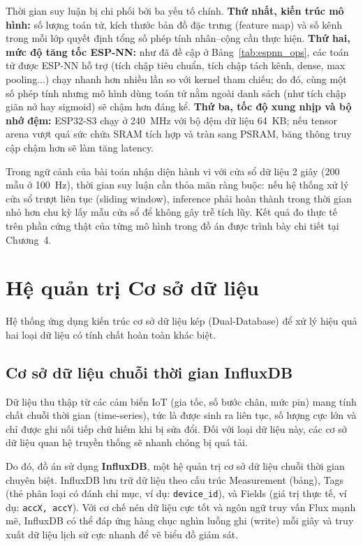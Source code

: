 \documentclass[../DoAn.tex]{subfiles}
\begin{document}
Thời gian suy luận bị chi phối bởi ba yếu tố chính. \textbf{Thứ nhất, kiến trúc mô hình:} số lượng toán tử, kích thước bản đồ đặc trưng (feature map) và số kênh trong mỗi lớp quyết định tổng số phép tính nhân--cộng cần thực hiện. \textbf{Thứ hai, mức độ tăng tốc ESP-NN:} như đã đề cập ở Bảng~\ref{tab:espnn_ops}, các toán tử được ESP-NN hỗ trợ (tích chập tiêu chuẩn, tích chập tách kênh, dense, max pooling...) chạy nhanh hơn nhiều lần so với kernel tham chiếu; do đó, cùng một số phép tính nhưng mô hình dùng toán tử nằm ngoài danh sách (như tích chập giãn nở hay sigmoid) sẽ chậm hơn đáng kể. \textbf{Thứ ba, tốc độ xung nhịp và bộ nhớ đệm:} ESP32-S3 chạy ở 240~MHz với bộ đệm dữ liệu 64~KB; nếu tensor arena vượt quá sức chứa SRAM tích hợp và tràn sang PSRAM, băng thông truy cập chậm hơn sẽ làm tăng latency.

Trong ngữ cảnh của bài toán nhận diện hành vi với cửa sổ dữ liệu 2 giây (200 mẫu ở 100~Hz), thời gian suy luận cần thỏa mãn ràng buộc: nếu hệ thống xử lý cửa sổ trượt liên tục (sliding window), inference phải hoàn thành trong thời gian nhỏ hơn chu kỳ lấy mẫu cửa sổ để không gây trễ tích lũy. Kết quả đo thực tế trên phần cứng thật của từng mô hình trong đồ án được trình bày chi tiết tại Chương~4.

\section{Hệ quản trị Cơ sở dữ liệu}
\label{section:3.5}

Hệ thống ứng dụng kiến trúc cơ sở dữ liệu kép (Dual-Database) để xử lý hiệu quả hai loại dữ liệu có tính chất hoàn toàn khác biệt.

\subsection{Cơ sở dữ liệu chuỗi thời gian InfluxDB}
Dữ liệu thu thập từ các cảm biến IoT (gia tốc, số bước chân, mức pin) mang tính chất chuỗi thời gian (time-series), tức là được sinh ra liên tục, số lượng cực lớn và chỉ được ghi nối tiếp chứ hiếm khi bị sửa đổi. Đối với loại dữ liệu này, các cơ sở dữ liệu quan hệ truyền thống sẽ nhanh chóng bị quá tải. 

Do đó, đồ án sử dụng \textbf{InfluxDB}, một hệ quản trị cơ sở dữ liệu chuỗi thời gian chuyên biệt. InfluxDB lưu trữ dữ liệu theo cấu trúc Measurement (bảng), Tags (thẻ phân loại có đánh chỉ mục, ví dụ: \texttt{device\_id}), và Fields (giá trị thực tế, ví dụ: \texttt{accX, accY}). Với cơ chế nén dữ liệu cực tốt và ngôn ngữ truy vấn Flux mạnh mẽ, InfluxDB có thể đáp ứng hàng chục nghìn luồng ghi (write) mỗi giây và truy xuất dữ liệu lịch sử cực nhanh để vẽ biểu đồ giám sát.
\end{document}
